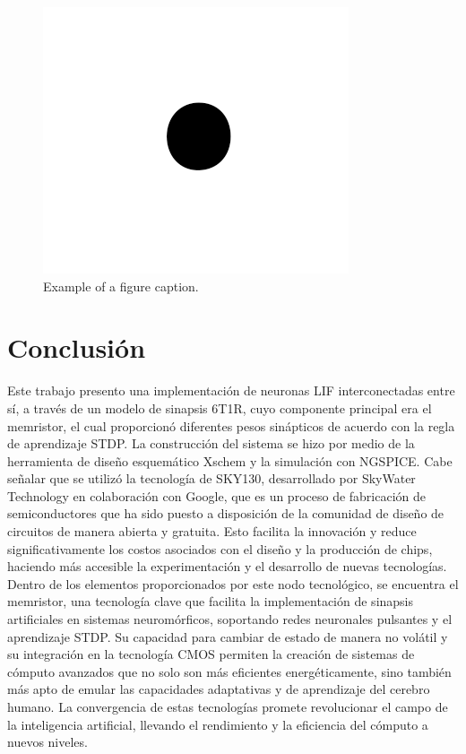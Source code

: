 \documentclass[conference]{IEEEtran}
\begin{document}
\begin{figure}[htbp]
\centerline{\includegraphics{img/fig1.png}}
\caption{Example of a figure caption.}
\label{fig}
\end{figure}

\section*{Conclusión}

Este trabajo presento una implementación de neuronas LIF interconectadas entre sí, a través de un modelo de sinapsis 6T1R, cuyo componente principal era el memristor, el cual proporcionó diferentes pesos sinápticos de acuerdo con la regla de aprendizaje STDP. La construcción del sistema se hizo por medio de la herramienta de diseño esquemático Xschem y la simulación con NGSPICE. Cabe señalar que se utilizó la tecnología de SKY130, desarrollado por SkyWater Technology en colaboración con Google, que es un proceso de fabricación de semiconductores que ha sido puesto a disposición de la comunidad de diseño de circuitos de manera abierta y gratuita. Esto facilita la innovación y reduce significativamente los costos asociados con el diseño y la producción de chips, haciendo más accesible la experimentación y el desarrollo de nuevas tecnologías. Dentro de los elementos proporcionados por este nodo tecnológico, se encuentra el memristor, una tecnología clave que facilita la implementación de sinapsis artificiales en sistemas neuromórficos, soportando redes neuronales pulsantes y el aprendizaje STDP. Su capacidad para cambiar de estado de manera no volátil y su integración en la tecnología CMOS permiten la creación de sistemas de cómputo avanzados que no solo son más eficientes energéticamente, sino también más apto de emular las capacidades adaptativas y de aprendizaje del cerebro humano. La convergencia de estas tecnologías promete revolucionar el campo de la inteligencia artificial, llevando el rendimiento y la eficiencia del cómputo a nuevos niveles.



\end{document}
